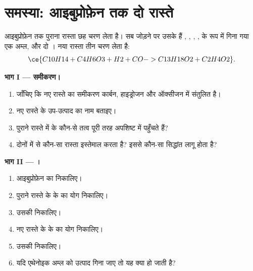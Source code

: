 \section{समस्या: आइबुप्रोफ़ेन तक दो रास्ते}

\begin{problem}
\label{pb:g12:synthesis-strategy:1}
आइबुप्रोफ़ेन  तक पुराना रास्ता छह चरण लेता है। सब
जोड़ने पर उसके  हैं , ,
, ,  के रूप में गिना गया एक अम्ल,
 और दो । नया रास्ता तीन चरण लेता है:
\[
  \ce{C10H14 + C4H6O3 + H2 + CO -> C13H18O2 + C2H4O2} .
\]

\medskip
\noindent\textbf{भाग I --- समीकरण।}
\begin{enumerate}
  \item जाँचिए कि नए रास्ते का समीकरण कार्बन,
        हाइड्रोजन और ऑक्सीजन में संतुलित है।
  \item नए रास्ते के उप-उत्पाद का नाम बताइए।
  \item पुराने रास्ते में  के कौन-से तत्व पूरी तरह
        अपशिष्ट में पहुँचते हैं?
  \item दोनों में से कौन-सा रास्ता  इस्तेमाल करता है? इससे कौन-सा सिद्धांत
        लागू होता है?
\end{enumerate}

\medskip
\noindent\textbf{भाग II --- ।}
\begin{enumerate}[resume]
  \item आइबुप्रोफ़ेन का  निकालिए।
  \item पुराने रास्ते के  के  का योग
        निकालिए।
  \item उसकी  निकालिए।
  \item नए रास्ते के  के  का
        योग निकालिए।
  \item उसकी  निकालिए।
  \item यदि एथेनोइक अम्ल को
        उत्पाद गिना जाए तो यह क्या हो जाती है?
\end{enumerate}


\end{problem}

